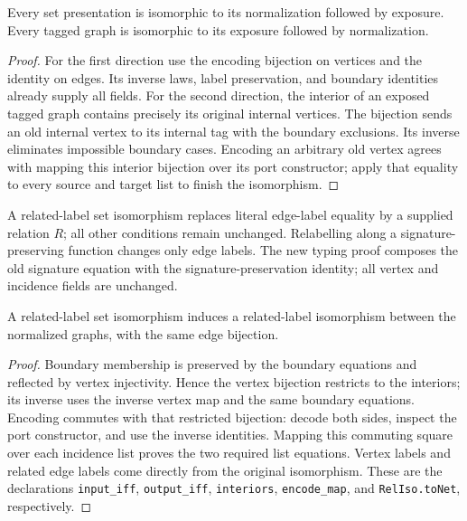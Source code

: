 \begin{theorem}
Every set presentation is isomorphic to its normalization followed by exposure.
Every tagged graph is isomorphic to its exposure followed by normalization.
\end{theorem}
\begin{proof}
For the first direction use the encoding bijection on vertices and the identity
on edges. Its inverse laws, label preservation, and boundary identities already
supply all fields. For the second direction, the interior of an exposed tagged
graph contains precisely its original internal vertices. The bijection sends
an old internal vertex to its internal tag with the boundary exclusions.
Its inverse eliminates impossible boundary cases. Encoding an arbitrary old
vertex agrees with mapping this interior bijection over its port constructor;
apply that equality to every source and target list to finish the isomorphism.
\end{proof}




\begin{definition}
A related-label set isomorphism replaces literal edge-label equality by a
supplied relation $R$; all other conditions remain unchanged. Relabelling
along a signature-preserving function changes only edge labels. The new typing
proof composes the old signature equation with the signature-preservation
identity; all vertex and incidence fields are unchanged.
\end{definition}


\begin{lemma}
A related-label set isomorphism induces a related-label isomorphism between
the normalized graphs, with the same edge bijection.
\end{lemma}
\begin{proof}
Boundary membership is preserved by the boundary equations and reflected by
vertex injectivity. Hence the vertex bijection restricts to the interiors;
its inverse uses the inverse vertex map and the same boundary equations.
Encoding commutes with that restricted bijection: decode both sides, inspect
the port constructor, and use the inverse identities. Mapping this commuting
square over each incidence list proves the two required list equations.
Vertex labels and related edge labels come directly from the original
isomorphism. These are the declarations \texttt{input\_iff},
\texttt{output\_iff}, \texttt{interiors}, \texttt{encode\_map}, and
\texttt{RelIso.toNet}, respectively.
\end{proof}

